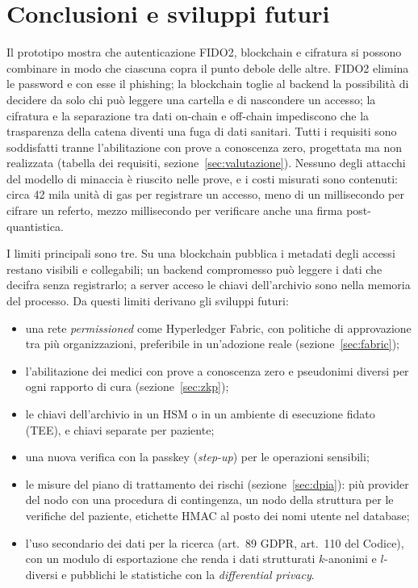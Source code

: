 \section{Conclusioni e sviluppi futuri}\label{sec:conclusioni}

Il prototipo mostra che autenticazione FIDO2, blockchain e cifratura si possono combinare in modo che ciascuna copra il punto debole delle altre. FIDO2 elimina le password e con esse il phishing; la blockchain toglie al backend la possibilità di decidere da solo chi può leggere una cartella e di nascondere un accesso; la cifratura e la separazione tra dati on-chain e off-chain impediscono che la trasparenza della catena diventi una fuga di dati sanitari. Tutti i requisiti sono soddisfatti tranne l'abilitazione con prove a conoscenza zero, progettata ma non realizzata (tabella dei requisiti, sezione~\ref{sec:valutazione}). Nessuno degli attacchi del modello di minaccia è riuscito nelle prove, e i costi misurati sono contenuti: circa 42 mila unità di gas per registrare un accesso, meno di un millisecondo per cifrare un referto, mezzo millisecondo per verificare anche una firma post-quantistica.

I limiti principali sono tre. Su una blockchain pubblica i metadati degli accessi restano visibili e collegabili; un backend compromesso può leggere i dati che decifra senza registrarlo; a server acceso le chiavi dell'archivio sono nella memoria del processo. Da questi limiti derivano gli sviluppi futuri:
\begin{itemize}
  \item una rete \emph{permissioned} come Hyperledger Fabric, con politiche di approvazione tra più organizzazioni, preferibile in un'adozione reale (sezione~\ref{sec:fabric});
  \item l'abilitazione dei medici con prove a conoscenza zero e pseudonimi diversi per ogni rapporto di cura (sezione~\ref{sec:zkp});
  \item le chiavi dell'archivio in un HSM o in un ambiente di esecuzione fidato (TEE), e chiavi separate per paziente;
  \item una nuova verifica con la passkey (\emph{step-up}) per le operazioni sensibili;
  \item le misure del piano di trattamento dei rischi (sezione~\ref{sec:dpia}): più provider del nodo con una procedura di contingenza, un nodo della struttura per le verifiche del paziente, etichette HMAC al posto dei nomi utente nel database;
  \item l'uso secondario dei dati per la ricerca (art.~89 GDPR, art.~110 del Codice), con un modulo di esportazione che renda i dati strutturati $k$-anonimi e $l$-diversi\cite{k-anonymity,l-diversity} e pubblichi le statistiche con la \emph{differential privacy}\cite{dwork-dp}.
\end{itemize}
